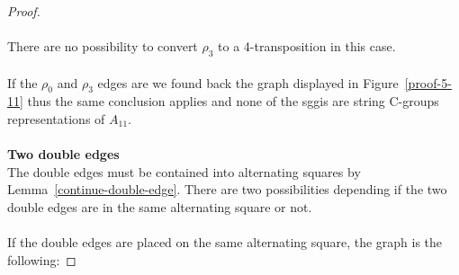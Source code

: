 \begin{proof}
\begin{figure}[H]
\begin{center}
    \caption{}
    \label{proof-5-24}
  \end{center}
\end{figure}

\paragraph{}
There are no possibility to convert $\rho_3$ to a 4-transposition in this case.

\paragraph{}
If the $\rho_0$ and $\rho_3$ edges are we found back the graph displayed in Figure~\ref{proof-5-11} thus the same conclusion applies and none of the sggis are string C-groups representations of $A_{11}$.

\paragraph{}
\textbf{Two double edges}\\
The double edges must be contained into alternating squares by Lemma~\ref{continue-double-edge}. There are two possibilities depending if the two double edges are in the same alternating square or not.

\paragraph{}
If the double edges are placed on the same alternating square, the graph is the following:


\end{proof}
